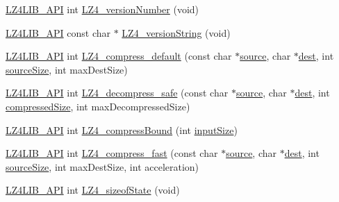 \begin{DoxyCompactItemize}
\item 
\hyperlink{compat-lz4_8h_a00a61e1435005f8a621edf4bbe0ef844}{L\+Z4\+L\+I\+B\+\_\+\+A\+P\+I} int \hyperlink{compat-lz4_8h_a5a98ff918f30c73b398535b8fb4c3b9b}{L\+Z4\+\_\+version\+Number} (void)
\item 
\hyperlink{compat-lz4_8h_a00a61e1435005f8a621edf4bbe0ef844}{L\+Z4\+L\+I\+B\+\_\+\+A\+P\+I} const char $\ast$ \hyperlink{compat-lz4_8h_a41fa97a26c1537d72b2cd5556bf01819}{L\+Z4\+\_\+version\+String} (void)
\item 
\hyperlink{compat-lz4_8h_a00a61e1435005f8a621edf4bbe0ef844}{L\+Z4\+L\+I\+B\+\_\+\+A\+P\+I} int \hyperlink{compat-lz4_8h_a7a99ebb0d007cb52765821274a7a5179}{L\+Z4\+\_\+compress\+\_\+default} (const char $\ast$\hyperlink{compat-lz4_8h_a0211201f992ec3f0b641c9ceff5f837a}{source}, char $\ast$\hyperlink{compat-lz4_8h_accb93c5987f80eedf1f5da3cfa1c0d22}{dest}, int \hyperlink{compat-lz4_8h_a3ec1875e6c6b9099ad690a7a4e9487b4}{source\+Size}, int max\+Dest\+Size)
\item 
\hyperlink{compat-lz4_8h_a00a61e1435005f8a621edf4bbe0ef844}{L\+Z4\+L\+I\+B\+\_\+\+A\+P\+I} int \hyperlink{compat-lz4_8h_aedd5ff2835959ab058b140d4437cfd7c}{L\+Z4\+\_\+decompress\+\_\+safe} (const char $\ast$\hyperlink{compat-lz4_8h_a0211201f992ec3f0b641c9ceff5f837a}{source}, char $\ast$\hyperlink{compat-lz4_8h_accb93c5987f80eedf1f5da3cfa1c0d22}{dest}, int \hyperlink{compat-lz4_8h_a0f9a0600771a3eb50c56e55266a7da49}{compressed\+Size}, int max\+Decompressed\+Size)
\item 
\hyperlink{compat-lz4_8h_a00a61e1435005f8a621edf4bbe0ef844}{L\+Z4\+L\+I\+B\+\_\+\+A\+P\+I} int \hyperlink{compat-lz4_8h_a7d92f596953d35893e39db626ae321ee}{L\+Z4\+\_\+compress\+Bound} (int \hyperlink{compat-lz4_8h_a8f274f682cf5ca365dd560d994011541}{input\+Size})
\item 
\hyperlink{compat-lz4_8h_a00a61e1435005f8a621edf4bbe0ef844}{L\+Z4\+L\+I\+B\+\_\+\+A\+P\+I} int \hyperlink{compat-lz4_8h_a4f16d7ba96053d8562595243d24b0f82}{L\+Z4\+\_\+compress\+\_\+fast} (const char $\ast$\hyperlink{compat-lz4_8h_a0211201f992ec3f0b641c9ceff5f837a}{source}, char $\ast$\hyperlink{compat-lz4_8h_accb93c5987f80eedf1f5da3cfa1c0d22}{dest}, int \hyperlink{compat-lz4_8h_a3ec1875e6c6b9099ad690a7a4e9487b4}{source\+Size}, int max\+Dest\+Size, int acceleration)
\item 
\hyperlink{compat-lz4_8h_a00a61e1435005f8a621edf4bbe0ef844}{L\+Z4\+L\+I\+B\+\_\+\+A\+P\+I} int \hyperlink{compat-lz4_8h_a6b79b9da156ef5597696201f2e218a5a}{L\+Z4\+\_\+sizeof\+State} (void)

\end{DoxyCompactItemize}
